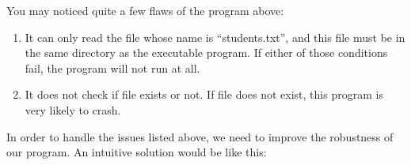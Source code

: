 \documentclass[../main.tex]{subfiles}
\begin{document}
    You may noticed quite a few flaws of the program above:
    \begin{enumerate}
        \item It can only read the file whose name is ``students.txt'', and this
        file must be in the same directory as the executable program. If either
        of those conditions fail, the program will not run at all.
        \item It does not check if file exists or not. If file does not exist, this
        program is very likely to crash.
    \end{enumerate}

    In order to handle the issues listed above, we need to improve the robustness
    of our program. An intuitive solution would be like this:
    
\end{document}
